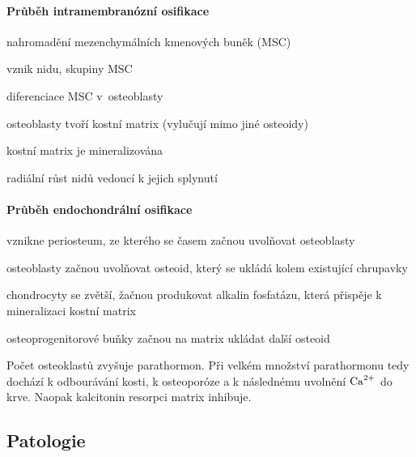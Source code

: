 \documentclass[DIV=8]{scrreprt}
\begin{document}
\paragraph{Průběh intramembranózní osifikace}
\begin{myEnumerate}[nosep]
    \item nahromadění mezenchymálních kmenových buněk (MSC)
    \item vznik nidu, skupiny MSC
    \item diferenciace MSC v osteoblasty
    \item osteoblasty tvoří kostní matrix (vylučují mimo jiné osteoidy)
    \item kostní matrix je mineralizována
    \item radiální růst nidů vedoucí k jejich splynutí
\end{myEnumerate}



\paragraph{Průběh endochondrální osifikace}
\begin{myEnumerate}[nosep]
    \item vznikne periosteum, ze kterého se časem začnou uvolňovat osteoblasty
    \item osteoblasty začnou uvolňovat osteoid, který se ukládá kolem existující chrupavky
    \item chondrocyty se zvětší, žačnou produkovat alkalin fosfatázu, která přispěje k mineralizaci kostní matrix
    \item osteoprogenitorové buňky začnou na matrix ukládat další osteoid
\end{myEnumerate}



Počet osteoklastů zvyšuje parathormon. Při velkém množství parathormonu tedy dochází k odbourávání kosti, k osteoporóze a k následnému uvolnění \(\ce{Ca^{2+}}\) do krve. Naopak kalcitonin resorpci matrix inhibuje.

\subsection{Patologie} \label{Patologie}
\end{document}

